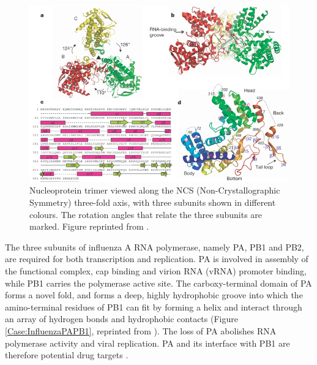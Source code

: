 \begin{figure}
\centering
\includegraphics[width=\linewidth]{Case/InfluenzaNucleoprotein.jpg}
\caption{Nucleoprotein trimer viewed along the NCS (Non-Crystallographic Symmetry) three-fold axis, with three subunits shown in different colours. The rotation angles that relate the three subunits are marked. Figure reprinted from \citep{1140}.}
\label{Case:InfluenzaNucleoprotein}
\end{figure}

The three subunits of influenza A RNA polymerase, namely PA, PB1 and PB2, are required for both transcription and replication. PA is involved in assembly of the functional complex, cap binding and virion RNA (vRNA) promoter binding, while PB1 carries the polymerase active site. The carboxy-terminal domain of PA forms a novel fold, and forms a deep, highly hydrophobic groove into which the amino-terminal residues of PB1 can fit by forming a helix and interact through an array of hydrogen bonds and hydrophobic contacts (Figure \ref{Case:InfluenzaPAPB1}, reprinted from \citep{1141}). The loss of PA abolishes RNA polymerase activity and viral replication. PA and its interface with PB1 are therefore potential drug targets \citep{1141}.

